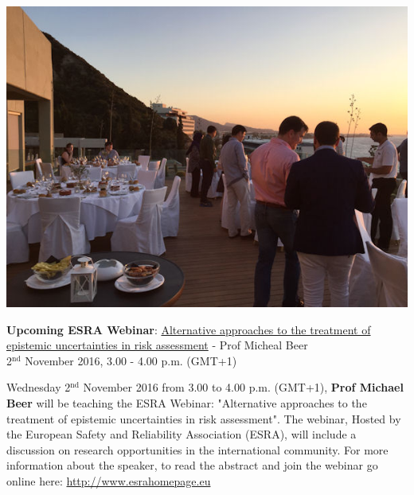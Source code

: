 \documentclass[11pt]{article}%
\begin{document}
\begin{minipage}{1.\textwidth}
\begin{multicols}{2}
\includegraphics[width=1\linewidth]{training/QFRA2016_21.JPG}

\end{multicols}
\end{minipage}

\begin{minipage}{1.\textwidth}
\vspace{20pt}
{\LARGE {{\bf Upcoming ESRA Webinar}: \href{http://esra.eu-vri.eu/home.aspx?lan=230&tab=2768&itm=2768&pag=1082}{Alternative approaches to the treatment of epistemic uncertainties in risk assessment} - Prof Micheal Beer}}\\
{\large 2$^{\text{nd}}$ November 2016, 3.00 - 4.00 p.m. (GMT+1) }
\begin{multicols}{2}

Wednesday 2$^{\text{nd}}$ November 2016 from 3.00 to 4.00 p.m. (GMT+1), {\bf Prof Michael Beer}  will be teaching the ESRA Webinar: "Alternative approaches to the treatment of epistemic uncertainties in risk assessment". The webinar, Hosted by the European Safety and Reliability Association (ESRA),  will include a discussion on research opportunities in the international community. For more information about the speaker, to read the abstract and join the webinar go online here: \href{http://www.esrahomepage.eu}{http://www.esrahomepage.eu}

\end{multicols}
\end{minipage}
\end{document}
